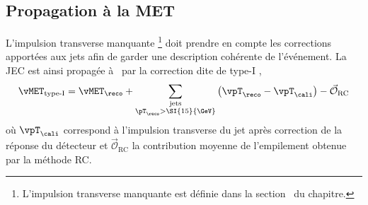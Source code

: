 \subsection{Propagation à la MET}\label{chapter-JERC-section-CMS-subsec-MET}
L'impulsion transverse manquante \vMET\footnote{L'impulsion transverse manquante est définie dans la section~ du chapitre.} doit prendre en compte les corrections apportées aux jets afin de garder une description cohérente de l'événement.
La JEC est ainsi propagée à \vMET\ par la correction dite de \og type-I \fg,
\begin{equation}
\vMET_\text{type-I} = \vMET_\reco + \sum_{\substack{\text{jets}\\\pT_\reco>\SI{15}{\GeV}}} \left(\vpT_\reco - \vpT_\cali\right) - \vec{\mathcal{O}}_\text{RC}
\end{equation}
où $\vpT_\cali$ correspond à l'impulsion transverse du jet après correction de la réponse du détecteur
et
$\vec{\mathcal{O}}_\text{RC}$ la contribution moyenne de l'empilement obtenue par la méthode RC.
